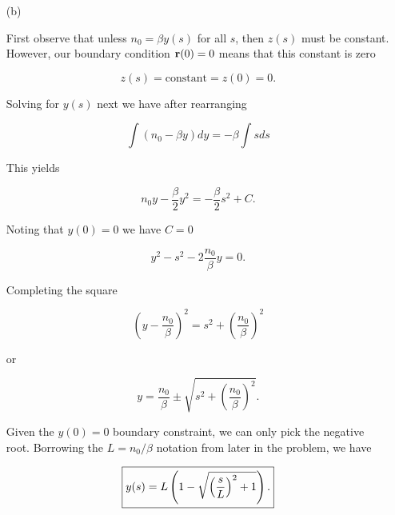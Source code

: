 {\begin{enumerate}
We have two non-trivial differential equations to solve.

\item[(b)]

First observe that unless $n_0 = \beta y(s)$ for all $s$, then $z(s)$ must be constant.  However, our boundary condition $\mathbf{r}(0) = 0$ means that this constant is zero

\begin{equation}\label{eqn:modernOpticsProblemSet1P2:110}
z(s) = \text{constant} = z(0) = 0.
\end{equation}

Solving for $y(s)$ next we have after rearranging

\begin{dmath}\label{eqn:modernOpticsProblemSet1P2:130}
\int \left( n_0 - \beta y \right) dy = -\beta \int s ds
\end{dmath}

This yields

\begin{dmath}\label{eqn:modernOpticsProblemSet1P2:150}
n_0 y - \frac{\beta}{2} y^2 = -\frac{\beta}{2} s^2 + C.
\end{dmath}

Noting that $y(0) = 0$ we have $C = 0$

\begin{dmath}\label{eqn:modernOpticsProblemSet1P2:170}
y^2 - s^2 - 2 \frac{n_0}{\beta} y = 0.
\end{dmath}

Completing the square

\begin{dmath}\label{eqn:modernOpticsProblemSet1P2:230}
\left( y - \frac{n_0}{\beta} \right)^2 = s^2 + \left( \frac{n_0}{\beta} \right)^2
\end{dmath}

or

\begin{dmath}\label{eqn:modernOpticsProblemSet1P2:190}
y = \frac{n_0}{\beta} \pm \sqrt{ s^2 + \left( \frac{n_0}{\beta} \right)^2 }.
\end{dmath}

Given the $y(0) = 0$ boundary constraint, we can only pick the negative root.  Borrowing the $L = n_0/\beta$ notation from later in the problem, we have

\begin{dmath}\label{eqn:modernOpticsProblemSet1P2:210}
\myBoxed{
y(s) = L \left( 1 - \sqrt{ \left( \frac{s}{L}\right)^2 + 1 } \right) .
}
\end{dmath}


\end{enumerate}}
